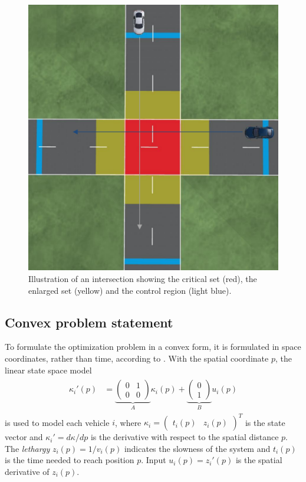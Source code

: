 \documentclass[letterpaper,10pt,conference]{ieeeconf}
\begin{document}
\begin{figure}[h!]
    \centering
    \includegraphics[width=0.9\columnwidth]{czone.pdf}
    \caption{Illustration of an intersection showing the critical set (red), the enlarged set (yellow) and the control region (light blue).}
    \label{fig:ProbState}
\end{figure}

\subsection{Convex problem statement}
To formulate the optimization problem in a convex form, it is formulated in space coordinates, rather than time, according to \cite{nikolce}. With the spatial coordinate $p$, the linear state space model
\begin{align}\label{statesp}
\begin{split}
\kappa_i'(p)&=\underbrace{\begin{pmatrix}
0& 1\\
0& 0
\end{pmatrix}}_{{A}}\kappa_i(p) + \underbrace{\begin{pmatrix}
0\\
1\end{pmatrix}}_Bu_i(p)
\end{split}
\end{align}
is used to model each vehicle $i$, where $\kappa_i=\begin{pmatrix}t_i(p)& z_i(p)\end{pmatrix}^T$ is the state vector and $\kappa_i'=d\kappa/dp$ is the derivative with respect to the spatial distance $p$. The \emph{lethargy} \mbox{$z_i(p)=1/v_i(p)$} indicates the slowness of the system and $t_i(p)$ is the time needed to reach position $p$. Input $u_i(p)=z_i'(p)$ is the spatial derivative of $z_i(p)$.
\end{document}
